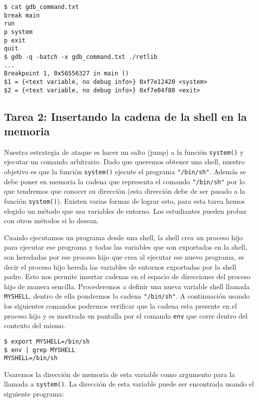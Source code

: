 \begin{lstlisting}
$ cat gdb_command.txt
break main
run
p system
p exit
quit
$ gdb -q -batch -x gdb_command.txt ./retlib
...
Breakpoint 1, 0x56556327 in main ()
$1 = {<text variable, no debug info>} 0xf7e12420 <system>
$2 = {<text variable, no debug info>} 0xf7e04f80 <exit>
\end{lstlisting}
 



\subsection{Tarea 2: Insertando la cadena de la shell en la memoria}

Nuestra estrategia de ataque es hacer un salto (jump) a la función \texttt{system()} y ejecutar un comando arbitrario. Dado que queremos obtener una shell, nuestro objetivo es que la función \texttt{system()} ejecute el programa \texttt{"/bin/sh"}. Además se debe poner en memoria la cadena que representa el comando \texttt{"/bin/sh"} por lo que tendremos que conocer su dirección (esta dirección debe de ser pasado a la función \texttt{system()}). Existen varias formas de lograr esto, para esta tarea hemos elegido un método que usa variables de entorno.
Los estudiantes pueden probar con otros métodos si lo desean.  

Cuando ejecutamos un programa desde una shell, la shell crea un proceso hijo para ejecutar ese programa y todas las variables que son exportadas en la shell, son heredadas por ese proceso hijo que crea al ejecutar ese nuevo programa, es decir el proceso hijo hereda las variables de entornos exportadas por la shell padre.
Esto nos permite insertar cadenas en el espacio de direcciones del proceso hijo de manera sencilla.
Procederemos a definir una nueva variable shell llamada \texttt{MYSHELL}, dentro de ella pondremos la cadena \texttt{"/bin/sh"}. 
A continuación usando los siguientes comandos podremos verificar que la cadena esta presente en el proceso hijo y es mostrada en pantalla por el comando \texttt{env} que corre dentro del contexto del mismo.

\begin{lstlisting}
$ export MYSHELL=/bin/sh
$ env | grep MYSHELL
MYSHELL=/bin/sh
\end{lstlisting}

Usaremos la dirección de memoria de esta variable como argumento para la llamada a {\tt system()}. La dirección de esta variable puede ser encontrada usando el siguiente programa: 

